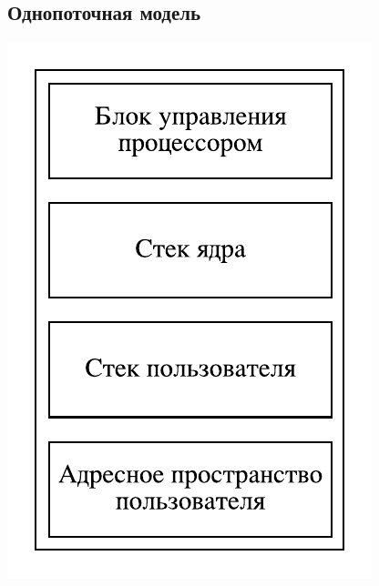 \documentclass[a4paper, 14pt]{report}
\begin{document}
\subsection{Однопоточная модель}

\includegraphics{os9}
\end{document}
